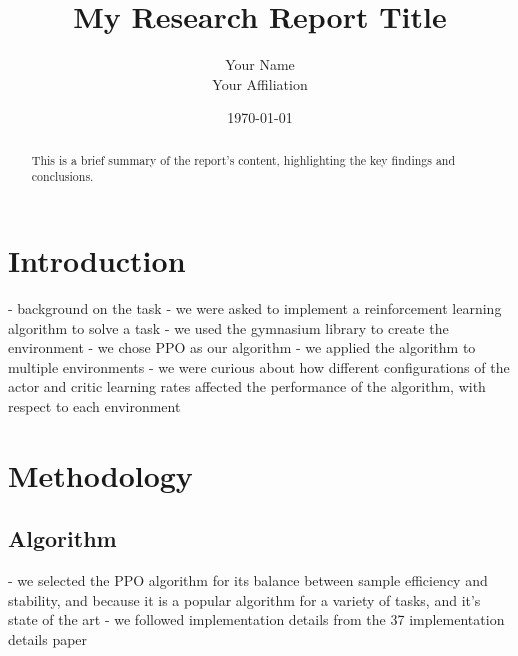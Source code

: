 \documentclass{article}
\title{My Research Report Title}
\author{Your Name \\ Your Affiliation}
\date{\today}
\begin{document}
\maketitle

\begin{abstract}
This is a brief summary of the report's content, highlighting the key findings and conclusions.
\end{abstract}

\section{Introduction}
- background on the task
  - we were asked to implement a reinforcement learning algorithm to solve a task
  - we used the gymnasium library to create the environment
  - we chose PPO as our algorithm
  - we applied the algorithm to multiple environments
  - we were curious about how different configurations of the actor and critic learning rates affected the performance of the algorithm, with respect to each environment

\section{Methodology}

\subsection{Algorithm}
- we selected the PPO algorithm for its balance between sample efficiency and stability, and because it is a popular algorithm for a variety of tasks, and it's state of the art
- we followed implementation details from the 37 implementation details paper \cite{shengyi2022the37implementation}
\end{document}
